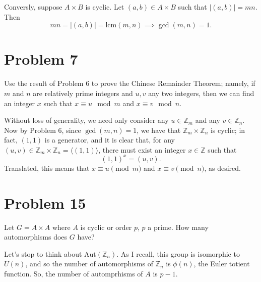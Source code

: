 \documentclass[12pt]{article}
\newcommand{\lcm}{\mbox{lcm}}
\newcommand{\Z}{\mathbb{Z}}
\newcommand{\aut}{\mbox{Aut}}
\begin{document}
Conversly, suppose $A\times B$ is cyclic.  Let $(a,b)\in A\times B$ such that $|(a,b)|=mn$.
Then
\begin{equation*}
mn=|(a,b)|=\lcm(m,n)\implies\gcd(m,n)=1.
\end{equation*}

\section*{Problem 7}

Use the result of Problem 6 to prove the Chinese Remainder Theorem; namely, if $m$ and $n$
are relatively prime integers and $u,v$ any two integers, then we can find an integer $x$ such that
$x\equiv u\mod m$ and $x\equiv v\mod n$.

Without loss of generality, we need only consider any $u\in\Z_m$ and any $v\in\Z_n$.
Now by Problem 6, since $\gcd(m,n)=1$, we have that $\Z_m\times\Z_n$ is cyclic;
in fact, $(1,1)$ is a generator, and it is clear that, for any $(u,v)\in\Z_m\times\Z_n=\langle(1,1)\rangle$,
there must exist an integer $x\in\Z$ such that
\begin{equation*}
(1,1)^x=(u,v).
\end{equation*}
Translated, this means that $x\equiv u\pmod{m}$ and $x\equiv v\pmod{n}$, as desired.

\section*{Problem 15}

Let $G=A\times A$ where $A$ is cyclic or order $p$, $p$ a prime.  How many automorphisms does $G$ have?

Let's stop to think about $\aut(\Z_n)$.  As I recall, this group is isomorphic to $U(n)$, and so the number of
automorphisms of $\Z_n$ is $\phi(n)$, the Euler totient function.  So, the number of automprhisms of $A$
is $p-1$.
\end{document}
